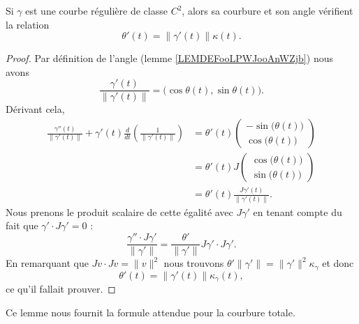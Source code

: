 \begin{lemma}       \label{LEMooWLAUooKetUiW}
    Si \( \gamma\) est une courbe régulière de classe \( C^2\), alors sa courbure et son angle vérifient la relation
    \begin{equation}
        \theta'(t)=\| \gamma'(t) \|\kappa(t).
    \end{equation}
\end{lemma}

\begin{proof}
    Par définition de l'angle (lemme \ref{LEMDEFooLPWJooAnWZjb}) nous avons
    \begin{equation}
        \frac{ \gamma'(t) }{ \| \gamma'(t) \| }=\big( \cos\theta(t),\sin\theta(t) \big).
    \end{equation}
    Dérivant cela,
    \begin{subequations}
        \begin{align}
            \frac{ \gamma''(t) }{ \| \gamma'(t) \| }+\gamma'(t)\frac{ d  }{ dt }\left( \frac{1}{ \| \gamma'(t) \| } \right)&=\theta'(t)
            \begin{pmatrix}
                -\sin\big( \theta(t) \big)\\
                \cos\big( \theta(t) \big)
            \end{pmatrix}\\
            &=\theta'(t)J\begin{pmatrix}
                \cos\big( \theta(t) \big)   \\ 
                \sin\big( \theta(t) \big)    
            \end{pmatrix}\\
            &=\theta'(t)\frac{ J\gamma'(t) }{ \| \gamma'(t) \| }.
        \end{align}
    \end{subequations}
    Nous prenons le produit scalaire de cette égalité avec \( J\gamma'\) en tenant compte du fait que \( \gamma'\cdot J\gamma'=0\) :
    \begin{equation}
        \frac{ \gamma''\cdot J\gamma' }{ \| \gamma' \| }=\frac{ \theta' }{ \| \gamma' \| }J\gamma'\cdot J\gamma'.
    \end{equation}
    En remarquant que \( Jv\cdot Jv=\| v \|^2\) nous trouvons \( \theta'\| \gamma' \|=\| \gamma' \|^2\kappa_{\gamma}\) et donc
    \begin{equation}
        \theta'(t)=\| \gamma'(t) \|\kappa_{\gamma}(t),
    \end{equation}
    ce qu'il fallait prouver.
\end{proof}
Ce lemme nous fournit la formule attendue pour la courbure totale.

